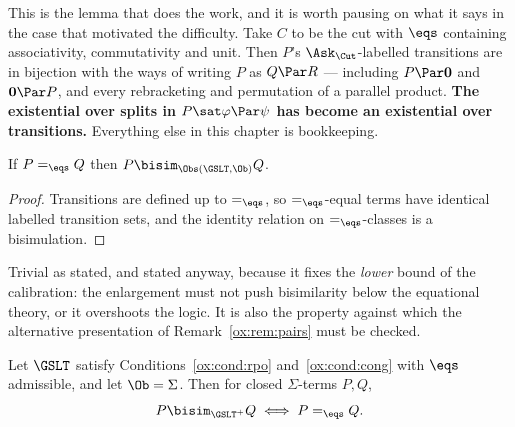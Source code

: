 This is the lemma that does the work, and it is worth pausing on what it says in
the case that motivated the difficulty. Take $C$ to be the cut with $\eqs$
containing associativity, commutativity and unit. Then $P$'s $\Ask_{\Cut}$-labelled
transitions are in bijection with the ways of writing $P$ as $Q \Par R$ ---
including $P \Par \mathbf{0}$ and $\mathbf{0} \Par P$, and every rebracketing and
permutation of a parallel product. \textbf{The existential over splits in
$P \sat \varphi \Par \psi$ has become an existential over transitions.} Everything
else in this chapter is bookkeeping.

\begin{lemma}[Calibration]
\label{ox:lem:calib}
If $P =_{\eqs} Q$ then $P \bisim_{\Obs(\GSLT,\Ob)} Q$.
\end{lemma}

\begin{proof}
Transitions are defined up to $=_{\eqs}$, so $=_{\eqs}$-equal terms have identical
labelled transition sets, and the identity relation on $=_{\eqs}$-classes is a
bisimulation.
\end{proof}

Trivial as stated, and stated anyway, because it fixes the \emph{lower} bound of
the calibration: the enlargement must not push bisimilarity below the equational
theory, or it overshoots the logic. It is also the property against which the
alternative presentation of Remark~\ref{ox:rem:pairs} must be checked.

\begin{theorem}[Reconstruction]
\label{ox:thm:main}
Let $\GSLT$ satisfy Conditions~\ref{ox:cond:rpo} and~\ref{ox:cond:cong} with
$\eqs$ admissible, and let $\Ob = \Sigma$. Then for closed $\Sigma$-terms $P,Q$,
\[
  P \bisim_{\GSLT^{+}} Q \iff P =_{\eqs} Q .
\]
\end{theorem}

